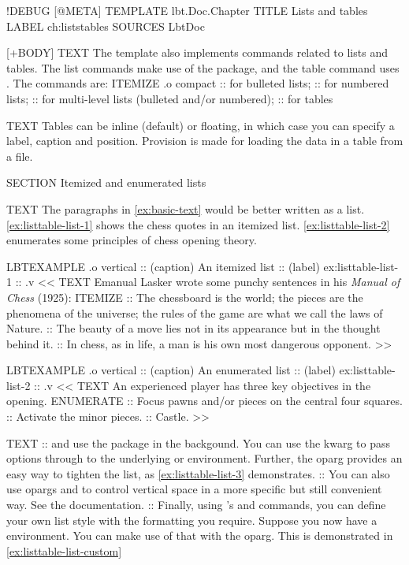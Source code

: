 \begin{lbt}
  !DEBUG
  [@META]
    TEMPLATE lbt.Doc.Chapter
    TITLE Lists and tables
    LABEL ch:liststables
    SOURCES LbtDoc

  [+BODY]
    TEXT The  template also implements commands related to lists and tables. The list commands make use of the  package, and the table command uses . The commands are:
    ITEMIZE .o compact
    ::  for bulleted lists;
    ::  for numbered lists;
    ::  for multi-level lists (bulleted and/or numbered);
    ::  for tables

    TEXT Tables can be inline (default) or floating, in which case you can specify a label, caption and position. Provision is made for loading the data in a table from a file.

    SECTION Itemized and enumerated lists

    TEXT The paragraphs in \cref{ex:basic-text} would be better written as a list. \cref{ex:listtable-list-1} shows the chess quotes in an itemized list. \cref{ex:listtable-list-2} enumerates some principles of chess opening theory.

    LBTEXAMPLE .o vertical
    :: (caption) An itemized list
    :: (label) ex:listtable-list-1
    :: .v <<
      TEXT Emanual Lasker wrote some punchy sentences in his \emph{Manual of Chess} (1925):
      ITEMIZE
      :: The chessboard is the world; the pieces are the phenomena of the universe; the rules of the game are what we call the laws of Nature.
      :: The beauty of a move lies not in its appearance but in the thought behind it.
      :: In chess, as in life, a man is his own most dangerous opponent.
    >>

    LBTEXAMPLE .o vertical
    :: (caption) An enumerated list
    :: (label) ex:listtable-list-2
    :: .v <<
      TEXT An experienced player has three key objectives in the opening.
      ENUMERATE
      :: Focus pawns and/or pieces on the central four squares.
      :: Activate the minor pieces.
      :: Castle.
    >>

    TEXT
    ::  and  use the  package in the backgound. You can use the kwarg  to pass options through to the underlying  or  environment. Further, the oparg  provides an easy way to tighten the list, as \cref{ex:listtable-list-3} demonstrates.
    :: You can also use opargs  and  to control vertical space in a more specific but still convenient way. See the documentation.
    :: Finally, using 's  and  commands, you can define your own list style with the formatting you require. Suppose you now have a  environment. You can make use of that with the  oparg. This is demonstrated in \cref{ex:listtable-list-custom}


\end{lbt}
